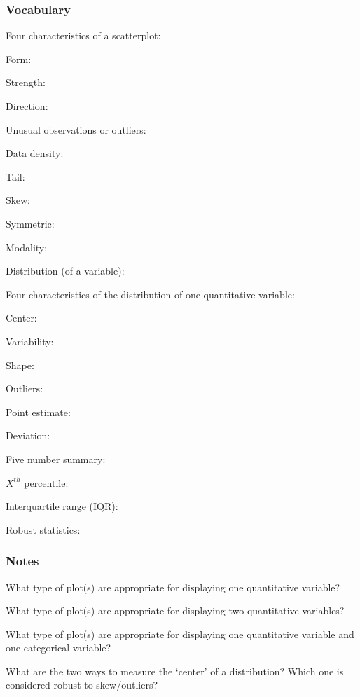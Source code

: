 \documentclass[
]{report}
\newcommand{\rgs}{\vspace{12pt}} %
\newcommand{\rgi}{\hspace{24pt}}  %
\begin{document}
\hypertarget{vocabulary-5}{%
\subsubsection*{Vocabulary}\label{vocabulary-5}}

Four characteristics of a scatterplot:

\rgi Form:
\rgs

\rgi Strength:
\rgs

\rgi Direction:
\rgs

\rgi Unusual observations or outliers:
\rgs

Data density:
\rgs

Tail:
\rgs

Skew:
\rgs

Symmetric:
\rgs

Modality:
\rgs

Distribution (of a variable):
\rgs

\rgi Four characteristics of the distribution of one quantitative variable:

\rgi Center:
\rgs

\rgi Variability:
\rgs

\rgi Shape:
\rgs

\rgi Outliers:
\rgs

Point estimate:
\rgs

Deviation:
\rgs

Five number summary:
\rgs

\(X^{th}\) percentile:
\rgs

Interquartile range (IQR):
\rgs

Robust statistics:
\rgs

\hypertarget{notes-6}{%
\subsubsection*{Notes}\label{notes-6}}

What type of plot(s) are appropriate for displaying one quantitative variable?
\rgs

What type of plot(s) are appropriate for displaying two quantitative variables?
\rgs

What type of plot(s) are appropriate for displaying one quantitative variable and one categorical variable?
\rgs

What are the two ways to measure the `center' of a distribution? Which one is considered robust to skew/outliers?
\rgs
\end{document}
